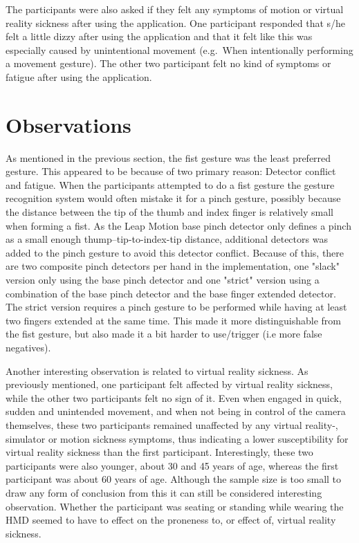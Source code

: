 The participants were also asked if they felt any symptoms of motion or virtual reality sickness after using the application. 
One participant responded that s/he felt a little dizzy after using the application and that it felt like this was especially caused by unintentional movement 
(e.g.~When intentionally performing a movement gesture). The other two participant felt no kind of symptoms or fatigue after using the application.

\section{Observations}
As mentioned in the previous section, the fist gesture was the least preferred gesture.
This appeared to be because of two primary reason: Detector conflict and fatigue.
When the participants attempted to do a fist gesture the gesture recognition system would often mistake it for a pinch gesture,
possibly because the distance between the tip of the thumb and index finger is relatively small when forming a fist. As the Leap Motion base pinch detector only defines a pinch
as a small enough thump--tip-to-index-tip distance, additional detectors was added to the pinch gesture to avoid this detector conflict. 
Because of this, there are two composite pinch
detectors per hand in the implementation, one "slack" version only using the base pinch detector and one "strict" version using a combination of the base
pinch detector and the base finger extended detector. The strict version requires a pinch gesture to be performed while having at least two fingers extended at the same time. 
This made it more distinguishable from the fist gesture, but also made it a bit harder to use/trigger (i.e more false negatives).

Another interesting observation is related to virtual reality sickness. As previously mentioned, one participant felt affected by virtual reality sickness, while 
the other two participants felt no sign of it. Even when engaged in quick, sudden and unintended movement, and when not being in control of the camera themselves, these 
two participants remained unaffected by any virtual reality-, simulator or motion sickness symptoms, thus indicating a lower susceptibility for virtual reality sickness 
than the first participant. Interestingly, these two participants were also younger, about 30 and 45 years of age, whereas the first participant was 
about 60 years of age. Although the sample size is too small to draw any form of conclusion from this it can still be considered interesting observation.
Whether the participant was seating or standing while wearing the HMD seemed to have to effect on the proneness to, or effect of, virtual reality sickness.



